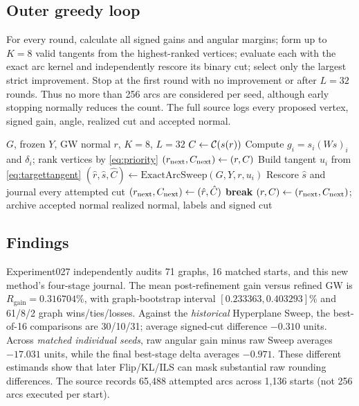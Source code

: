 \subsection{Outer greedy loop}
For every round, calculate all signed gains and angular margins; form up to $K=8$ valid tangents from the highest-ranked vertices; evaluate each with the exact arc kernel and independently rescore its binary cut; select only the largest strict improvement. Stop at the first round with no improvement or after $L=32$ rounds. Thus no more than 256 arcs are considered per seed, although early stopping normally reduces the count. The full source logs every proposed vertex, signed gain, angle, realized cut and accepted normal.

\begin{algorithm}[tb]
\caption{Angular Gain Greedy}\label{alg:gain}
\begin{algorithmic}[1]
\Require $G$, frozen $Y$, GW normal $r$, $K=8$, $L=32$
\State $C\gets\mathcal{C}(s(r))$
 \State Compute $g_i=s_i(Ws)_i$ and $\delta_i$; rank vertices by \eqref{eq:priority}
 \State $(r_{\rm next},C_{\rm next})\gets(r,C)$
  \State Build tangent $u_i$ from \eqref{eq:targettangent}
  \State $(\hat r,\hat s,\hat C)\gets\mathrm{ExactArcSweep}(G,Y,r,u_i)$
  \State Rescore $\hat s$ and journal every attempted cut
   \State $(r_{\rm next},C_{\rm next})\gets(\hat r,\hat C)$
  \EndIf
 \EndFor
 \State \textbf{break}\EndIf
 \State $(r,C)\gets(r_{\rm next},C_{\rm next})$; archive accepted normal
\EndFor
\State \Return realized normal, labels and signed cut
\end{algorithmic}
\end{algorithm}

\subsection{Findings}
Experiment027 independently audits 71 graphs, 16 matched starts, and this new method's four-stage journal. The mean post-refinement gain versus refined GW is $R_{\mathrm{gain}}=0.316704\%$, with graph-bootstrap interval $[0.233363,0.403293]\%$ and 61/8/2 graph wins/ties/losses. Against the \emph{historical} Hyperplane Sweep, the best-of-16 comparisons are 30/10/31; average signed-cut difference $-0.310$ units. Across \emph{matched individual seeds}, raw angular gain minus raw Sweep averages $-17.031$ units, while the final best-stage delta averages $-0.971$. These different estimands show that later Flip/KL/ILS can mask substantial raw rounding differences. The source records 65,488 attempted arcs across 1,136 starts (not 256 arcs executed per start).
